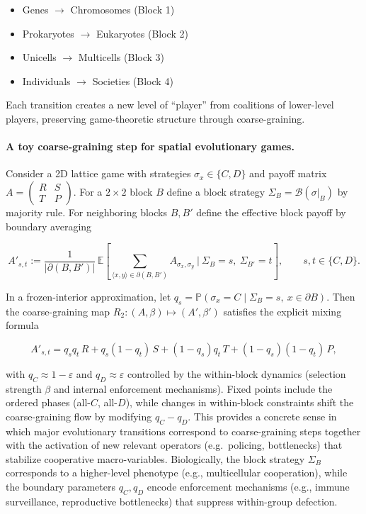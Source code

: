 \documentclass[12pt,a4paper]{article}
\theoremstyle{remark}
\begin{document}
\begin{itemize}
    \item Genes $\to$ Chromosomes (Block 1)
    \item Prokaryotes $\to$ Eukaryotes (Block 2)
    \item Unicells $\to$ Multicells (Block 3)
    \item Individuals $\to$ Societies (Block 4)
\end{itemize}

Each transition creates a new level of ``player'' from coalitions of lower-level players, preserving game-theoretic structure through coarse-graining.

\paragraph{A toy coarse-graining step for spatial evolutionary games.}
Consider a 2D lattice game with strategies $\sigma_x\in\{C,D\}$ and payoff matrix
$A=\begin{pmatrix}R&S\\ T&P\end{pmatrix}$.
For a $2\times 2$ block $B$ define a block strategy $\Sigma_B=\mathcal B(\sigma|_B)$ by majority rule.
For neighboring blocks $B,B'$ define the effective block payoff by boundary averaging

\[
A'_{s,t}
:=\frac{1}{|\partial(B,B')|}\,
\mathbb E\!\left[\sum_{\langle x,y\rangle\in\partial(B,B')} A_{\sigma_x,\sigma_y}\ \Big|\ \Sigma_B=s,\ \Sigma_{B'}=t\right],
\qquad s,t\in\{C,D\}.
\]

In a frozen-interior approximation, let
$q_s=\mathbb P(\sigma_x=C\mid \Sigma_B=s,\ x\in\partial B)$.
Then the coarse-graining map $R_2:(A,\beta)\mapsto(A',\beta')$ satisfies the explicit mixing formula

\[
A'_{s,t}
= q_s q_t\,R + q_s(1-q_t)\,S + (1-q_s)q_t\,T + (1-q_s)(1-q_t)\,P,
\]

with $q_C\approx 1-\varepsilon$ and $q_D\approx \varepsilon$ controlled by the within-block dynamics (selection strength $\beta$ and internal enforcement mechanisms).
Fixed points include the ordered phases (all-$C$, all-$D$), while changes in within-block constraints shift the coarse-graining flow by modifying $q_C-q_D$.
This provides a concrete sense in which major evolutionary transitions correspond to coarse-graining steps together with the activation of new relevant operators (e.g.\ policing, bottlenecks) that stabilize cooperative macro-variables. Biologically, the block strategy $\Sigma_B$ corresponds to a higher-level phenotype (e.g., multicellular cooperation), while the boundary parameters $q_C, q_D$ encode enforcement mechanisms (e.g., immune surveillance, reproductive bottlenecks) that suppress within-group defection.
\end{document}
